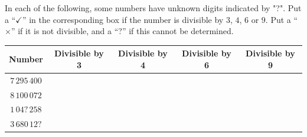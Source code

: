  In each of the following, some numbers have unknown digits indicated by "?". Put a ``$\checkmark$'' in the corresponding box if the number is divisible by $3$, $4$, $6$ or $9$. Put a ``$\times$'' if it is not divisible, and a ``?'' if this cannot be determined.
\par\finishquestion

\begin{center}
\begin{tabular}{|c|c|c|c|c|}
\hline
\textbf{Number} & \textbf{Divisible by 3} & \textbf{Divisible by 4} & \textbf{Divisible by 6} & \textbf{Divisible by 9} \\
\hline
$7\,295\,400$   &                          &                          &                          &                          \\
\hline
$8\,100\,072$   &                          &                          &                          &                          \\
\hline
$1\,04?\,258$   &                          &                          &                          &                          \\
\hline
$3\,680\,12?$   &                          &                          &                          &                          \\
\hline
\end{tabular}
\end{center}
